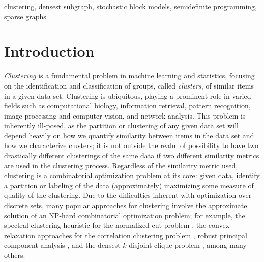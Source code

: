 \documentclass[twoside,11pt]{article}
\newcommand{\0}{\bs{0}}
\begin{document}
\begin{keywords}
	clustering, densest subgraph, stochastic block models, semidefinite programming,
	sparse graphs
\end{keywords}

\allowdisplaybreaks

\section{Introduction} \label{intro}
\emph{Clustering} is a fundamental problem in machine learning and statistics, focusing on the identification and classification
of groups, called \emph{clusters}, of similar items in a given data set. Clustering is ubiquitous, playing a prominent role
in varied fields such as computational biology, information retrieval, pattern recognition, image processing and computer vision,
and network analysis.
This problem is inherently ill-posed, as the partition or clustering of any given data set will depend heavily on how we
quantify similarity between items in the data set and how we characterize clusters; it is not outside the realm of possibility to
have two drastically different clusterings of the same data if two different similarity metrics are used in the clustering process.
Regardless of the similarity metric used, clustering is a combinatorial optimization
problem at its core: given data, identify a partition or labeling of the data (approximately) maximizing some
measure of quality of the clustering.
%
Due to the difficulties inherent with optimization over discrete sets, many popular approaches for clustering involve
the approximate solution of an NP-hard combinatorial optimization problem; for example, the spectral clustering heuristic
for the normalized cut problem \citep{dhillon2004kernel, ng2002spectral}, the convex relaxation
approaches for the correlation clustering problem \citep{mathieu2010correlation},
robust principal component analysis \citep{chen2014clustering, oymak2011finding},
and the densest $k$-disjoint-clique problem \citep{ames2014convex, ames2014guaranteed}, among many others.
\end{document}

